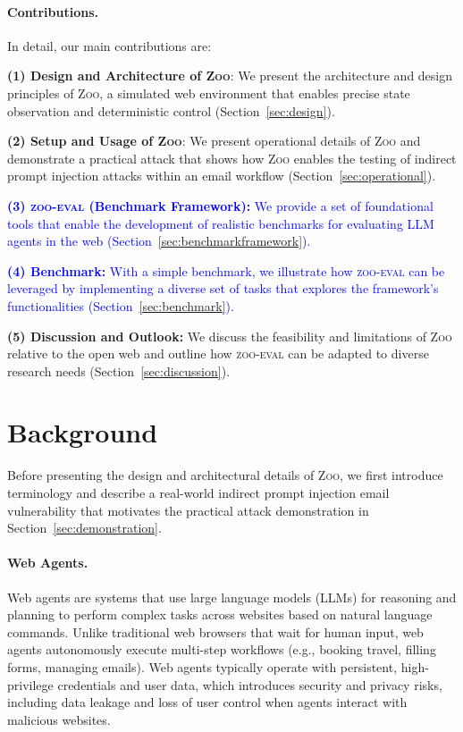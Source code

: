 \documentclass{article} %
\newcommand{\maricolor}{blue}
\newcommand{\zoo}{\textsc{Zoo}}
\newcommand{\zooeval}{\textsc{zoo-eval}}
\begin{document}
\paragraph{Contributions.} In detail, our main contributions are:

\textbf{(1) Design and Architecture of \zoo{}}: We present the architecture and design principles of \zoo{}, a simulated web environment that enables precise state observation and deterministic control (Section~\ref{sec:design}).

\textbf{(2) Setup and Usage of \zoo{}}:  We present operational details of \zoo{} and demonstrate a practical attack that shows how \zoo{} enables the testing of indirect prompt injection attacks within an email workflow (Section~\ref{sec:operational}).

\textcolor{\maricolor}{\textbf{(3) \zooeval{} (Benchmark Framework):} We provide a set of foundational tools that enable the development of realistic benchmarks for evaluating LLM agents in the web (Section~\ref{sec:benchmarkframework}).}

\textcolor{\maricolor}{\textbf{(4) Benchmark:} With a simple benchmark, we illustrate how \zooeval{} can be leveraged by implementing a diverse set of tasks that explores the framework's functionalities (Section~\ref{sec:benchmark}).}

\textbf{(5) Discussion and Outlook:} We discuss the feasibility and limitations of \zoo{} relative to the open web and outline how \zooeval{} can be adapted to diverse research needs (Section~\ref{sec:discussion}).


\section{Background}
\label{sec:background}

Before presenting the design and architectural details of \zoo{}, we first introduce terminology and describe a real-world indirect prompt injection email vulnerability that motivates the practical attack demonstration in Section~\ref{sec:demonstration}.

\paragraph{Web Agents.}
Web agents are systems that use large language models (LLMs) for reasoning and planning to perform complex tasks across websites based on natural language commands.
Unlike traditional web browsers that wait for human input, web agents autonomously execute multi-step workflows (e.g., booking travel, filling forms, managing emails).
Web agents typically operate with persistent, high-privilege credentials and user data, which introduces security and privacy risks, including data leakage and loss of user control when agents interact with malicious websites.
\end{document}
